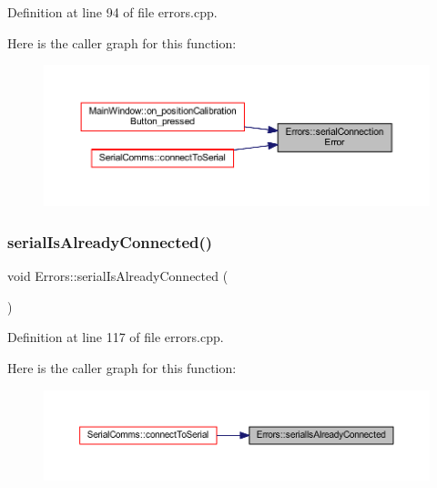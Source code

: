 Definition at line 94 of file errors.\+cpp.

Here is the caller graph for this function\+:
\nopagebreak
\begin{figure}[H]
\begin{center}
\leavevmode
\includegraphics[width=350pt]{class_errors_a5ed088325fbe34556ae24b8167eaf0fd_icgraph}
\end{center}
\end{figure}
\mbox{\label{class_errors_ad05246aaafe8e4e546e7b28bd2a21312}} 
\subsubsection{\texorpdfstring{serialIsAlreadyConnected()}{serialIsAlreadyConnected()}}
{\footnotesize\ttfamily void Errors\+::serial\+Is\+Already\+Connected (\begin{DoxyParamCaption}{ }\end{DoxyParamCaption})\hspace{0.3cm}{\ttfamily [static]}}



Definition at line 117 of file errors.\+cpp.

Here is the caller graph for this function\+:
\nopagebreak
\begin{figure}[H]
\begin{center}
\leavevmode
\includegraphics[width=350pt]{class_errors_ad05246aaafe8e4e546e7b28bd2a21312_icgraph}
\end{center}
\end{figure}
\mbox{\label{class_errors_a4d1bdcbd36b5df8317a4511226c5d55a}} 
